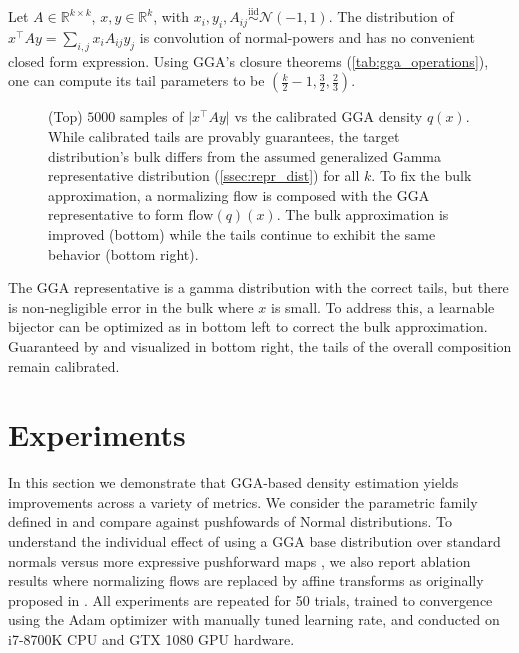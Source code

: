 \begin{example}
	Let $A \in \mathbb{R}^{k \times k}$, $x,y\in\mathbb{R}^k$, with $x_i,y_i,A_{ij} \overset{\text{iid}}{\sim} \mathcal{N}(-1,1)$.
	The distribution of $x^\top A y = \sum_{i,j} x_i A_{ij} y_j$ is convolution of normal-powers \citep{gupta2008analyzing} and has no convenient
	closed form expression.
	Using GGA's closure theorems (\cref{tab:gga_operations}), one can compute
	its tail parameters to be $(\frac{k}{2}-1,\frac{3}{2}, \frac{2}{3})$.

	\begin{figure}[h]
		\centering
		
		
		\caption{(Top) $5000$ samples of $\lvert x^\top A y \rvert$ vs the
		calibrated GGA density $q(x)$. While calibrated tails are provably guarantees,
		the target distribution's bulk differs from the assumed generalized Gamma representative distribution (\cref{ssec:repr_dist}) for all $k$.
		To fix the bulk approximation, a normalizing flow is composed with
		the GGA representative to form $\text{flow}(q)(x)$. The bulk approximation
		is improved (bottom) while the tails continue to exhibit the same
		behavior (bottom right).
		}
		\label{fig:power_normal}
	\end{figure}

	The GGA representative is a gamma distribution with the correct tails, but there is non-negligible error in the bulk where $x$ is small. To address this, a learnable bijector can be
	optimized as in  bottom left to correct the bulk approximation. Guaranteed by  and
	visualized in  bottom right, the tails of the overall composition remain calibrated.
\end{example}

\section{Experiments}\label{sec:experiments}

In this section we demonstrate that GGA-based density estimation yields improvements across a variety of metrics.
We consider the parametric family defined in  and compare against pushfowards of Normal distributions. To understand the individual
effect of using a GGA base distribution over standard normals versus more expressive pushforward maps \citep{durkan2019neural}, we also report ablation results where
normalizing flows are replaced by affine transforms as originally
proposed in \citep{kucukelbir2017automatic}. All experiments are repeated for 50 trials, trained to convergence using the Adam optimizer with manually tuned learning rate,
and conducted on i7-8700K CPU and GTX 1080 GPU hardware.

